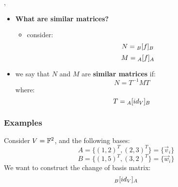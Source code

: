 \documentclass{exam}
\begin{document}
\sep 

\begin{itemize}
    \item \textbf{What are similar matrices?}
    \begin{itemize}
        \item consider:
        \[
        N = \cript{f}{B}{B}
        \]
        \[
        M = \cript{f}{A}{A}
        \]
    \end{itemize}
    \item we say that $N$ and $M$ are \textbf{similar matrices} if:
    \[
    N = T^{-1}MT
    \]
    where:
    \[
    T = \cript{id_V}{A}{B}
    \]
\end{itemize}

\subsubsection{Examples}

Consider $V = \F^2$, and the following bases:
\[
A = \{(1,2)^T, (2,3)^T\} = \{\vec{v}_i\}
\]
\[
B = \{(1,5)^T, (3,2)^T\} = \{\vec{w}_i\}
\]
We want to construct the change of basis matrix:
\[
\cript{id_V}{B}{A}
\]
\end{document}
